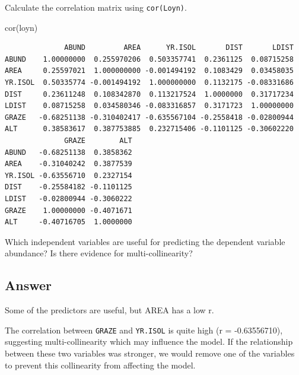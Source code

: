 \documentclass[
  10pt,
  letterpaper,
  DIV=11,
  numbers=noendperiod]{scrartcl}
\newenvironment{Shaded}{\begin{snugshade}}{\end{snugshade}}
\newcommand{\FunctionTok}[1]{\textcolor[rgb]{0.28,0.35,0.67}{#1}}
\newcommand{\NormalTok}[1]{\textcolor[rgb]{0.00,0.23,0.31}{#1}}
\begin{document}
Calculate the correlation matrix using \texttt{cor(Loyn)}.

\begin{Shaded}
\begin{Highlighting}[]
\FunctionTok{cor}\NormalTok{(loyn)}
\end{Highlighting}
\end{Shaded}

\begin{verbatim}
              ABUND         AREA      YR.ISOL       DIST       LDIST
ABUND    1.00000000  0.255970206  0.503357741  0.2361125  0.08715258
AREA     0.25597021  1.000000000 -0.001494192  0.1083429  0.03458035
YR.ISOL  0.50335774 -0.001494192  1.000000000  0.1132175 -0.08331686
DIST     0.23611248  0.108342870  0.113217524  1.0000000  0.31717234
LDIST    0.08715258  0.034580346 -0.083316857  0.3171723  1.00000000
GRAZE   -0.68251138 -0.310402417 -0.635567104 -0.2558418 -0.02800944
ALT      0.38583617  0.387753885  0.232715406 -0.1101125 -0.30602220
              GRAZE        ALT
ABUND   -0.68251138  0.3858362
AREA    -0.31040242  0.3877539
YR.ISOL -0.63556710  0.2327154
DIST    -0.25584182 -0.1101125
LDIST   -0.02800944 -0.3060222
GRAZE    1.00000000 -0.4071671
ALT     -0.40716705  1.0000000
\end{verbatim}

\begin{tcolorbox}[enhanced jigsaw, rightrule=.15mm, coltitle=black, leftrule=.75mm, titlerule=0mm, breakable, toprule=.15mm, bottomtitle=1mm, colback=white, toptitle=1mm, opacitybacktitle=0.6, bottomrule=.15mm, arc=.35mm, left=2mm, title=\textcolor{quarto-callout-warning-color}{\faExclamationTriangle}\hspace{0.5em}{Question 2}, colbacktitle=quarto-callout-warning-color!10!white, opacityback=0, colframe=quarto-callout-warning-color-frame]

Which independent variables are useful for predicting the dependent
variable abundance? Is there evidence for multi-collinearity?

\end{tcolorbox}

\hypertarget{answer-1}{%
\subsection{Answer}\label{answer-1}}

Some of the predictors are useful, but AREA has a low r.

The correlation between \texttt{GRAZE} and \texttt{YR.ISOL} is quite
high (r = -0.63556710), suggesting multi-collinearity which may
influence the model. If the relationship between these two variables was
stronger, we would remove one of the variables to prevent this
collinearity from affecting the model.
\end{document}
